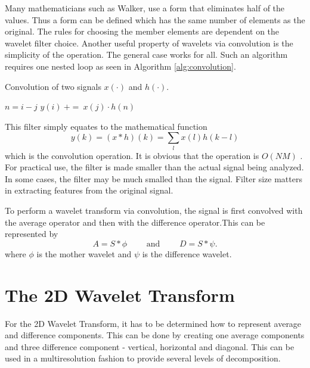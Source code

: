 Many mathematicians such as Walker\cite{walker}, use a form that
eliminates half of the values. Thus a form can be defined which has
the same number of elements as the original.  The rules for choosing
the member elements are dependent on the wavelet filter choice. 
Another useful property of wavelets via convolution is the simplicity
of the operation. The general case works for all.  Such an algorithm
requires one nested loop as seen in Algorithm \ref{alg:convolution}.

\begin{algorithm}
\caption{Convolution of two signals $x(\cdot)$ and $h(\cdot)$.}
\label{alg:convolution}
\begin{algorithmic}
\STATE $n=i-j$
\STATE$y(i) \  += \ x(j)\cdot h(n)$
\ENDIF
\ENDFOR
\ENDFOR
\end{algorithmic}
\end{algorithm}

This filter simply equates to the mathematical function
\[
y(k) = (x\ast h)(k) = \sum_{l}x(l)h(k-l)
\]
which is the convolution operation. It is obvious
that the operation is $O(NM)$ . For practical
use, the filter is made smaller than the actual signal being
analyzed. In some cases, the filter may be much smalled than the
signal. Filter size matters in extracting features from the original
signal.

To perform a wavelet transform via convolution, the signal is first
convolved with the average operator and then with the difference
operator.This can be represented by
\[
A = S \ast \phi 
\qquad \mbox{ and } \qquad
D = S \ast \psi.
\]
where $\phi$ is the mother wavelet and $\psi$ is the difference wavelet.

\section{The 2D Wavelet Transform} \label{sec:2Dwavelet}

For the 2D Wavelet Transform, it has to be determined how to represent
average and difference components. This can be done by creating one
average components and three difference component - vertical,
horizontal and diagonal. This can be used in a multiresolution fashion
to provide several levels of decomposition. 

